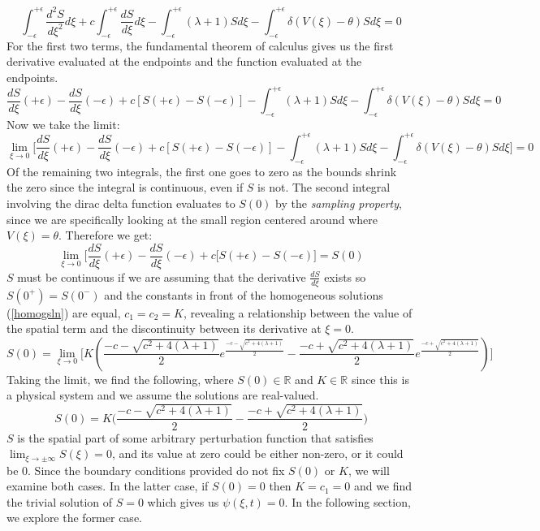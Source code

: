 \documentclass[12pt]{article}
\begin{document}
$$ \int_{-\epsilon}^{+\epsilon}\frac{d^2S}{d\xi^2}d\xi + c\int_{-\epsilon}^{+\epsilon}\frac{dS}{d\xi}d\xi - \int_{-\epsilon}^{+\epsilon}(\lambda + 1)Sd\xi - \int_{-\epsilon}^{+\epsilon}\delta(V(\xi)-\theta)Sd\xi = 0 $$
For the first two terms, the fundamental theorem of calculus gives us the first derivative evaluated at the endpoints and the function evaluated at the endpoints.
$$ \frac{dS}{d\xi}(+\epsilon) - \frac{dS}{d\xi}(-\epsilon) + c[S(+\epsilon) - S(-\epsilon)] - \int_{-\epsilon}^{+\epsilon}(\lambda + 1)Sd\xi - \int_{-\epsilon}^{+\epsilon}\delta(V(\xi)-\theta)Sd\xi = 0 $$
Now we take the limit:
$$ \lim_{\xi \to 0} \Bigg[ \frac{dS}{d\xi}(+\epsilon) - \frac{dS}{d\xi}(-\epsilon) + c[S(+\epsilon) - S(-\epsilon)] - \int_{-\epsilon}^{+\epsilon}(\lambda + 1)Sd\xi - \int_{-\epsilon}^{+\epsilon}\delta(V(\xi)-\theta)Sd\xi \Bigg]= 0 $$
Of the remaining two integrals, the first one goes to zero as the bounds shrink the zero since the integral is continuous, even if $S$ is not. The second integral involving the dirac delta function evaluates to $S(0)$ by the \textit{sampling property}, since we are specifically looking at the small region centered around where $V(\xi) = \theta$. Therefore we get:
$$ \lim_{\xi \to 0} \Bigg[ \frac{dS}{d\xi}(+\epsilon) - \frac{dS}{d\xi}(-\epsilon) + c[S(+\epsilon) - S(-\epsilon) \Bigg] = S(0) $$
$S$ must be continuous if we are assuming that the derivative $\frac{dS}{d\xi}$ exists so $S(0^+) = S(0^-)$ and the constants in front of the homogeneous solutions (\ref{homogsln}) are equal, $c_1 = c_2 = K$, revealing a relationship between the value of the spatial term and the discontinuity between its derivative at $\xi=0$.
$$ S(0) = \lim_{\xi \to 0} \Bigg[ K(\frac{-c-\sqrt{c^2+4(\lambda+1)}}{2}e^{\frac{-c-\sqrt{c^2+4(\lambda+1)}}{2}} - \frac{-c+\sqrt{c^2+4(\lambda+1)}}{2}e^{\frac{-c+\sqrt{c^2+4(\lambda+1)}}{2}})\Bigg] $$
Taking the limit, we find the following, where $S(0)\in \mathbb{R}$ and $K\in\mathbb{R}$ since this is a physical system and we assume the solutions are real-valued.
\begin{equation}\label{Keq}
S(0) = K\Bigg(\frac{-c-\sqrt{c^2+4(\lambda+1)}}{2} - \frac{-c+\sqrt{c^2+4(\lambda+1)}}{2} \Bigg)
\end{equation}
$S$ is the spatial part of some arbitrary perturbation function that satisfies $\lim_{\xi \to \pm \infty}S(\xi) = 0$, and its value at zero could be either non-zero, or it could be 0. Since the boundary conditions provided do not fix $S(0)$ or $K$, we will examine both cases. In the latter case, if $S(0) = 0$ then $K=c_1=0$ and we find the trivial solution of $S=0$ which gives us $\psi(\xi,t) = 0$. In the following section, we explore the former case.
\end{document}
